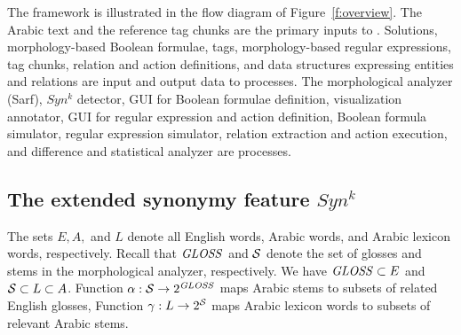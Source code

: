 

The \framework framework is illustrated in the flow diagram of
Figure~\ref{f:overview}.
The Arabic text and the reference tag chunks are the primary inputs to \framework. 
Solutions, morphology-based Boolean formulae, tags, 
morphology-based regular expressions, 
tag chunks, relation and action definitions, and data structures expressing entities 
and relations are input and output data to processes. 
The morphological analyzer (Sarf), $Syn^k$ detector, 
GUI for Boolean formulae definition, 
visualization annotator, GUI for regular expression and action definition, 
Boolean formula simulator, regular expression simulator, 
relation extraction and action execution, and difference and statistical analyzer 
are processes.


\subsection{The extended synonymy feature $Syn^k$}
\label{subsec:synk} 

The sets $E, A,$ and $L$ denote all English words, Arabic words, 
and Arabic lexicon words, respectively.
Recall that $\mathit{GLOSS}$ and $\ss$ denote the set of glosses and stems in the morphological analyzer, respectively.
We have $\mathit{GLOSS} \subset E$ and $\ss \subset L \subset A$. 
Function $\alpha: \ss \rightarrow 2^{\GG}$ maps Arabic stems to 
subsets of related English glosses, %
Function $\gamma: L \rightarrow 2^{\ss}$ maps Arabic lexicon words to subsets 
of relevant Arabic stems. %

